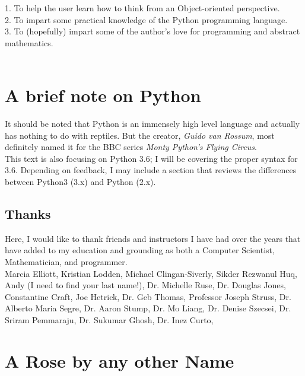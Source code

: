 \documentclass[oneside,12pt]{memoir} %
\begin{document}
1. To help the user learn how to think from an Object-oriented perspective. \\
2. To impart some practical knowledge of the Python programming language. \\
3. To (hopefully) impart some of the author's love for programming and abstract mathematics. \\
\\



\chapter*{A brief note on Python} %

	It should be noted that Python is an immensely high level language and actually has nothing to do with reptiles. But the creator, \emph{Guido van Rossum}, most definitely named it for the BBC series \emph{Monty Python's Flying Circus}. \\
	
	This text is also focusing on Python 3.6; I will be covering the proper syntax for 3.6. Depending on feedback, I may include a section that reviews the differences between Python3 (3.x) and Python (2.x). 
	
\section*{Thanks}

Here, I would like to thank friends and instructors I have had over the years that have added to my education and grounding as both a Computer Scientist, Mathematician, and programmer.\\

Marcia Elliott, Kristian Lodden, Michael Clingan-Siverly, Sikder Rezwanul Huq, Andy (I need to find your last name!), Dr. Michelle Ruse, Dr. Douglas Jones, Constantine Craft, Joe Hetrick, Dr. Geb Thomas, Professor Joseph Struss, Dr. Alberto Maria Segre, Dr. Aaron Stump, Dr. Mo Liang, Dr. Denise Szecsei, Dr. Sriram Pemmaraju, Dr. Sukumar Ghosh, Dr. Inez Curto, 




\chapter*{A Rose by any other Name}
\end{document}
